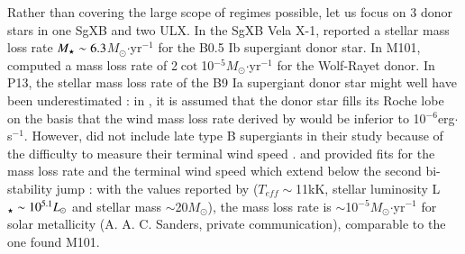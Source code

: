 \documentclass[letter]{aa}
\makeatletter
\newcommand{\sgx}{SgXB\xspace}
\newcommand{\ulx}{ULX\xspace}
\newcommand*{\ie}{i.e.\@\xspace}
\newcommand{\mystar}{{\fontfamily{lmr}\selectfont$\star$}}
\newcommand*{\msun}{$M_{\odot}$\@\xspace}
\newcommand*{\mdotacc}{$\dot{M}_{\text{acc}}$\@\xspace}
\makeatother
\begin{document}


Rather than covering the large scope of regimes possible, let us focus on 3 donor stars in one \sgx and two \ulx. In the \sgx Vela X-1, \cite{Gimenez-Garcia2016} reported a stellar mass loss rate $M_{\text{\mystar}}\sim6.3$\msun$\cdot$yr$^{-1}$ for the B0.5 Ib supergiant donor star. In M101, \cite{Liu2013} computed a mass loss rate of 2$\cot$10$^{-5}$\msun$\cdot$yr$^{-1}$ for the Wolf-Rayet donor. In P13, the stellar mass loss rate of the B9 Ia supergiant donor star might well have been underestimated : in \cite{Motch2014}, it is assumed that the donor star fills its Roche lobe on the basis that the wind mass loss rate derived by \cite{Kudritzki1999} would be inferior to 10$^{-6}$erg$\cdot$s$^{-1}$. However, \cite{Kudritzki1999} did not include late type B supergiants in their study because of the difficulty to measure their terminal wind speed \citep{Howarth1997}. \cite{Vink2000a} and \cite{Vink2001} provided fits for the mass loss rate and the terminal wind speed which extend below the second bi-stability jump \citep[\ie for effective temperatures $T_{eff}\lesssim12kK$][]{Lamers2000} : with the values reported by \cite{Motch2014} ($T_{eff}\sim$11kK, stellar luminosity L$_{\text{\mystar}}\sim10^{5.1}L_{\odot}$ and stellar mass $\sim$20\msun), the mass loss rate is $\sim$10$^{-5}$\msun$\cdot$yr$^{-1}$ for solar metallicity (A. A. C. Sanders, private communication), comparable to the one found M101.
\end{document}
